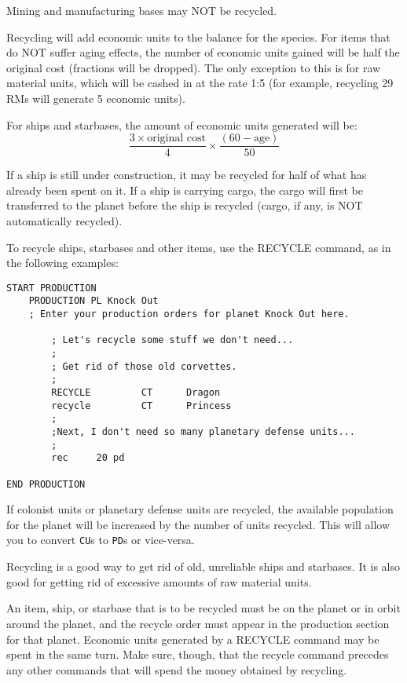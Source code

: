 \documentclass[10pt,titlepage]{article}
\begin{document}
Mining and manufacturing bases may NOT be recycled.

Recycling will add economic units to the balance for the species.  For items
that do NOT suffer aging effects, the number of economic units gained will be
half the original cost (fractions will be dropped).  The only exception to
this is for raw material units, which will be cashed in at the rate 1:5 (for
example, recycling 29 RMs will generate 5 economic units).

For ships and starbases, the amount of economic units generated will be:
\[
		\dfrac{3  \times  \textrm{original cost}}{4}      \times \dfrac{(60 - \textrm{age})}{50}
\]

If a ship is still under construction, it may be recycled for half of what has
already been spent on it.  If a ship is carrying cargo, the cargo will first be
transferred to the planet before the ship is recycled (cargo, if any, is NOT
automatically recycled).

To recycle ships, starbases and other items, use the RECYCLE command, as in the
following examples:

\begin{verbatim}
START PRODUCTION
    PRODUCTION PL Knock Out
    ; Enter your production orders for planet Knock Out here.

        ; Let's recycle some stuff we don't need...
        ;
        ; Get rid of those old corvettes.
        ;
        RECYCLE         CT      Dragon
        recycle         CT      Princess
        ;
        ;Next, I don't need so many planetary defense units...
        ;
        rec     20 pd

END PRODUCTION
\end{verbatim} 

If colonist units or planetary defense units are recycled, the available
population for the planet will be increased by the number of units recycled.
This will allow you to convert \texttt{CU}s to \texttt{PD}s or vice-versa.

Recycling is a good way to get rid of old, unreliable ships and starbases.  It
is also good for getting rid of excessive amounts of raw material units.

An item, ship, or starbase that is to be recycled must be on the planet or in
orbit around the planet, and the recycle order must appear in the production
section for that planet.  Economic units generated by a RECYCLE command may be
spent in the same turn.  Make sure, though, that the recycle command precedes
any other commands that will spend the money obtained by recycling.
\end{document}
